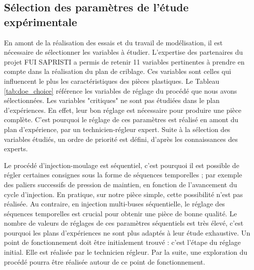\subsection{Sélection des paramètres de l'étude expérimentale} \label{subsec:l12_doe}
En amont de la réalisation des essais et du travail de modélisation, il est nécessaire de sélectionner les variables à étudier.
L'expertise des partenaires du projet FUI SAPRISTI a permis de retenir 11 variables pertinentes à prendre en compte dans la réalisation du plan de criblage.
Ces variables sont celles qui influencent le plus les caractéristiques des pièces plastiques.
Le Tableau \ref{tab:doe_choice} référence les variables de réglage du procédé que nous avons sélectionnées.
Les variables "critiques" ne sont pas étudiées dans le plan d'expériences.
En effet, leur bon réglage est nécessaire pour produire une pièce complète.
C'est pourquoi le réglage de ces paramètres est réalisé en amont du plan d'expérience, par un technicien-régleur expert.
Suite à la sélection des variables étudiés, un ordre de priorité est défini, d'après les connaissances des experts.

Le procédé d'injection-moulage est séquentiel, c'est pourquoi il est possible de régler certaines consignes sous la forme de séquences temporelles ; par exemple des paliers successifs de pression de maintien, en fonction de l'avancement du cycle d'injection.
En pratique, sur notre pièce simple, cette possibilité n'est pas réalisée.
Au contraire, en injection multi-buses séquentielle, le réglage des séquences temporelles est crucial pour obtenir une pièce de bonne qualité.
Le nombre de valeurs de réglages de ces paramètres séquentiels est très élevé, c'est pourquoi les plans d'expériences ne sont plus adaptés à leur étude exhaustive.
Un point de fonctionnement doit être initialement trouvé : c'est l'étape du réglage initial.
Elle est réalisée par le technicien régleur.
Par la suite, une exploration du procédé pourra être réalisée autour de ce point de fonctionnement.

